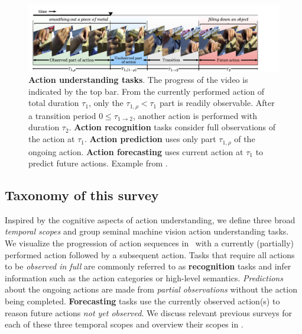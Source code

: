 \begin{figure}[t]
    \centering
    \includegraphics[width=\linewidth,trim={1cm 0 6cm 0},clip]{figs/action_understanding_tasks.pdf}
    \caption{\textbf{Action understanding tasks}. The progress of the video is indicated by the top bar. From the currently performed action of total duration $\tau_1$, only the $\tau_{1,\rho}<\tau_1 $ part is readily observable. After a transition period $0\leq\tau_{1 \rightarrow 2}$, another action is performed with duration $\tau_2$. \textbf{Action recognition} tasks consider full observations of the action at $\tau_1$. \textbf{Action prediction} uses only part $\tau_{1,\rho}$ of the ongoing action. \textbf{Action forecasting} uses current action at $\tau_1$ to predict future actions. Example from \citet{wang2019vatex}.} 
    \label{fig:tasks}
\end{figure}

\subsection{Taxonomy of this survey}

Inspired by the cognitive aspects of action understanding, we define three broad \emph{temporal scopes} and group seminal machine vision action understanding tasks. We visualize the progression of action sequences in~ with a currently (partially) performed action followed by a subsequent action. Tasks that require all actions to be \emph{observed in full} are commonly referred to as \textbf{recognition} tasks and infer information such as the action categories or high-level semantics. \emph{Predictions} about the ongoing actions are made from \emph{partial observations} without the action being completed. \textbf{Forecasting} tasks use the currently observed action(s) to reason future actions \emph{not yet observed}.  We discuss relevant previous surveys for each of these three temporal scopes and overview their scopes in .

